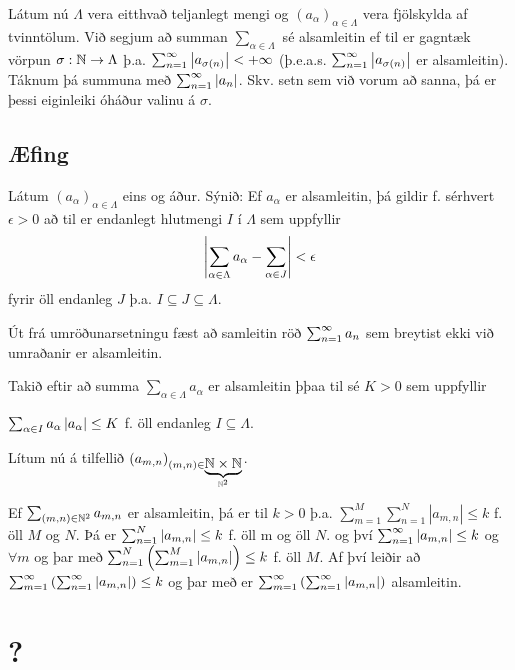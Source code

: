 \documentclass[12pt]{book}
\begin{document}
Látum nú $\Lambda$ vera eitthvað teljanlegt mengi og $(a_{\alpha})_{\alpha \in \Lambda}$ vera fjölskylda af tvinntölum. Við segjum að summan $\sum_{\alpha \in \Lambda}$ sé alsamleitin ef
til er gagntæk vörpun $\sigma: \mathbb{N} \to \Lambda$ þ.a. $\sum_{n = 1}^{\infty} \left|a_{\sigma(n)}\right| < +\infty$ (þ.e.a.s. $\sum_{n = 1}^{\infty} \left|a_{\sigma(n)}\right|$ er alsamleitin). Táknum þá summuna með $\sum_{n = 1}^{\infty} \left|a_n\right|$. Skv. setn sem við vorum að sanna, þá er þessi eiginleiki óháður valinu á $\sigma$.

\section*{Æfing}
Látum $(a_{\alpha})_{\alpha \in \Lambda}$ eins og áður. Sýnið: Ef $a_{\alpha}$ er alsamleitin, þá gildir f. sérhvert $\epsilon > 0$ að til er endanlegt hlutmengi $I$ í $\Lambda$ sem uppfyllir
\[ \left|\sum_{\alpha \in \Lambda} a_{\alpha} - \sum_{\alpha \in J} \right| < \epsilon \]
fyrir öll endanleg $J$ þ.a. $I \subseteq J \subseteq \Lambda $. 

\begin{ath} Út frá umröðunarsetningu fæst að samleitin röð $\sum_{n = 1}^{\infty} a_n$ sem breytist ekki við umraðanir er alsamleitin. 

{ 
    \def\aal{a_{\alpha}}
    \def\aall{(\aal)_{\alpha \in \Lambda}}
    \def\saal{\sum_{\alpha \in \Lambda} a_{\alpha}} 

\newcommand{\sal}[1]{\sum_{\alpha \in #1} a_{\alpha } }

Takið eftir að summa 
$\saal$ er alsamleitin þþaa til sé $ K > 0$ sem uppfyllir

$\sal{I} \abs{\aal} \leq K$ f. öll endanleg $I \subseteq \Lambda$.

\def\mn{(m,n)}
\def\amn{a_{m,n}}
Lítum nú á tilfellið $(\amn)_{\mn \in \underbrace{\N \times \N}_{\N^2}}$.

Ef $\sum_{\mn \in \N^2} \amn$ er alsamleitin, þá er til $k > 0$ þ.a.
$\sum_{m=1}^M \sum_{n=1}^N | \amn| \leq k$ f. öll $M$ og $N$.
Þá er $\sum_{n=1}^N \abs{\amn} \leq k$ f. öll m og öll $N$. og því
$\sumoinfty \abs{\amn} \leq k$ og $\forall m$ og þar með $\sum_{n=1}^N \left(\sum_{m=1}^M \abs{\amn}\right) \leq k$ f. öll $M$. Af því leiðir að $\sum_{m=1}^{\infty} \left( \sumoinfty \abs{\amn} \right) \leq k$ og þar með er $\sum_{m=1}^{\infty} \left( \sumoinfty \abs{\amn} \right)$ alsamleitin.
}

\end{ath}
\chapter{?}
\end{document}
